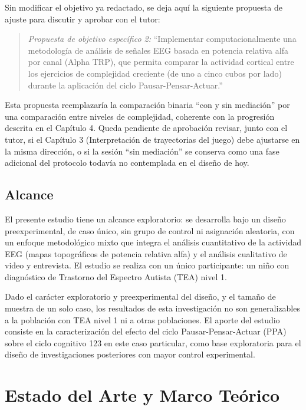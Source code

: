 \documentclass{book}
\begin{document}
Sin modificar el objetivo ya redactado, se deja aquí la siguiente propuesta de ajuste para discutir y aprobar con el tutor:

\begin{quote}
\textit{Propuesta de objetivo específico 2:} ``Implementar computacionalmente una metodología de análisis de señales EEG basada en potencia relativa alfa por canal (Alpha TRP), que permita comparar la actividad cortical entre los ejercicios de complejidad creciente (de uno a cinco cubos por lado) durante la aplicación del ciclo Pausar-Pensar-Actuar.''
\end{quote}

Esta propuesta reemplazaría la comparación binaria ``con y sin mediación'' por una comparación entre niveles de complejidad, coherente con la progresión descrita en el Capítulo 4. Queda pendiente de aprobación revisar, junto con el tutor, si el Capítulo 3 (Interpretación de trayectorias del juego) debe ajustarse en la misma dirección, o si la sesión ``sin mediación'' se conserva como una fase adicional del protocolo todavía no contemplada en el diseño de hoy.

\section{Alcance}

El presente estudio tiene un alcance exploratorio: se desarrolla bajo un diseño preexperimental, de caso único, sin grupo de control ni asignación aleatoria, con un enfoque metodológico mixto que integra el análisis cuantitativo de la actividad EEG (mapas topográficos de potencia relativa alfa) y el análisis cualitativo de video y entrevista. El estudio se realiza con un único participante: un niño con diagnóstico de Trastorno del Espectro Autista (TEA) nivel 1.

Dado el carácter exploratorio y preexperimental del diseño, y el tamaño de muestra de un solo caso, los resultados de esta investigación no son generalizables a la población con TEA nivel 1 ni a otras poblaciones. El aporte del estudio consiste en la caracterización del efecto del ciclo Pausar-Pensar-Actuar (PPA) sobre el ciclo cognitivo 123 en este caso particular, como base exploratoria para el diseño de investigaciones posteriores con mayor control experimental.






\chapter{Estado del Arte y Marco Teórico} %
\end{document}
